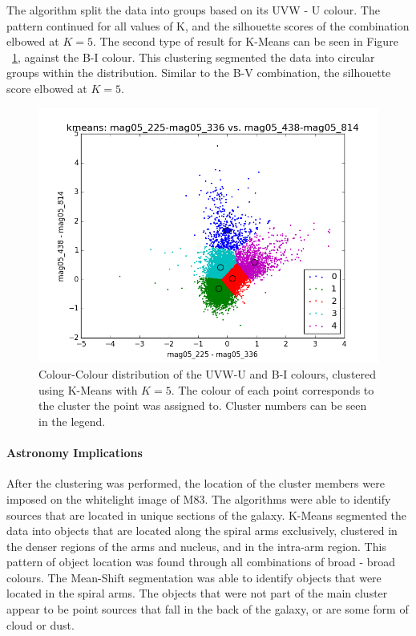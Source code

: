 The algorithm split the data into groups based on its UVW - U colour. The pattern continued for all values of K, and the silhouette scores of the combination elbowed at $K=5$.
The second type of result for K-Means can be seen in Figure ~\ref{fig:UVWKM2}, against the B-I colour. 
This clustering segmented the data into circular groups within the distribution. 
Similar to the B-V combination, the silhouette score elbowed at $K=5$.

\begin{figure}[H]
\centering
\includegraphics[width=\linewidth]{figs/kmeans_xy_5cl_mag05_225-mag05_336vsmag05_438-mag05_814}
\caption{Colour-Colour distribution of the UVW-U and B-I colours, clustered using K-Means with $K=5$. The colour of each point corresponds to the cluster the point was assigned to. Cluster numbers can be seen in the legend.}
\label{fig:UVWKM2}
\end{figure}

\paragraph{Astronomy Implications}
After the clustering was performed, the location of the cluster members were imposed on the whitelight image of M83.
The algorithms were able to identify sources that are located in unique sections of the galaxy.
K-Means segmented the data into objects that are located along the spiral arms exclusively, clustered in the denser regions of the arms and nucleus, and in the intra-arm region.
This pattern of object location was found through all combinations of broad - broad colours.
The Mean-Shift segmentation was able to identify objects that were located in the spiral arms.
The objects that were not part of the main cluster appear to be point sources that fall in the back of the galaxy, or are some form of cloud or dust.


